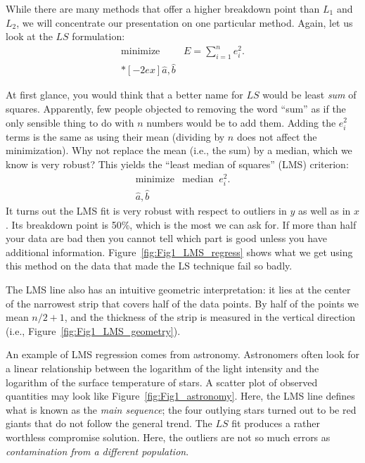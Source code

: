 While there are many methods that offer a higher breakdown point than $L_1$ and $L_2$, we will 
concentrate our presentation on one particular method.  Again, let us look at the $LS$ formulation:
$$
\begin{array}{cc}
\mbox{minimize} & \displaystyle E = \sum^n_{i=1} e^2_i. \\*[-2ex]
\hat{a}, \hat{b} \end{array}
$$
	 

At first glance, you would think that a better name for $LS$ would be least \emph{sum} of squares.  
Apparently, few people objected to removing the word ``sum'' as if the only sensible thing to do 
with $n$ numbers would be to add them.  Adding the $e_i^2$ terms is the same as using their mean (dividing 
by $n$ does not affect the minimization).  Why not replace the mean (i.e., the sum) by a median, which we know is 
very robust?  This yields the ``least median of squares'' (LMS) criterion:
\begin{equation}
\begin{array}{cc}
\mbox{minimize} & \mbox{median } \ e^2_i. \\
    \hat{a}, \hat{b} \end{array}
\end{equation}	 
It turns out the LMS fit is very robust with respect to outliers in $y$ as well as in $x$.  Its breakdown 
point is 50\%, which is the most we can ask for.  If more than half your data are bad then you cannot tell
which part is good unless you have additional information.
Figure~\ref{fig:Fig1_LMS_regress} shows what we get
using this method on the data that made the LS technique fail so badly.
	
The LMS line also has an intuitive geometric interpretation: it lies at the center of the narrowest 
strip that covers half of the data points.  By half of the points we mean $n/2 + 1$, and the thickness of 
the strip is measured in the vertical direction (i.e., Figure~\ref{fig:Fig1_LMS_geometry}).
	 

An example of LMS regression comes from astronomy.  Astronomers often look for a linear 
relationship between the logarithm of the light intensity and the logarithm of the surface temperature of stars.  A 
scatter plot of observed quantities may look like Figure~\ref{fig:Fig1_astronomy}.  Here, the LMS line defines what is known 
as the \emph{main sequence}; the four outlying stars turned out to be red giants that do not follow the general 
trend.  The $LS$ fit produces a rather worthless compromise solution.  Here, the outliers are not so 
much errors as \emph{contamination from a different population}.

